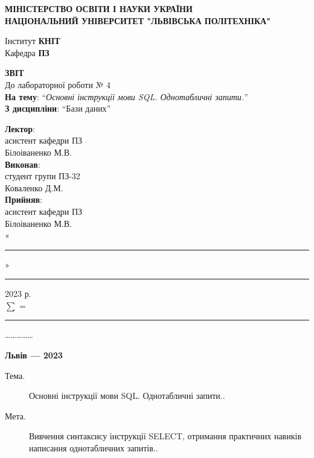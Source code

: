 \documentclass[14pt]{extreport}
\newcommand\subject{Бази даних}
\newcommand\lecturer{асистент кафедри ПЗ\\Білоіваненко М.В.}
\newcommand\teacher{асистент кафедри ПЗ\\Білоіваненко М.В.}
\newcommand\mygroup{ПЗ-32}
\newcommand\lab{4}
\newcommand\theme{Основні інструкції мови SQL. Однотабличні запити.}
\newcommand\purpose{Вивчення синтаксису інструкції SELECT, отримання практичних навиків
	написання однотабличних запитів.}
\begin{document}
\begin{normalsize}
	\begin{titlepage}
		\thispagestyle{empty}
		\begin{center}
			\textbf{МІНІСТЕРСТВО ОСВІТИ І НАУКИ УКРАЇНИ\\
				НАЦІОНАЛЬНИЙ УНІВЕРСИТЕТ "ЛЬВІВСЬКА ПОЛІТЕХНІКА"}
		\end{center}
		\begin{flushright}
			Інститут \textbf{КНІТ}\\
			Кафедра \textbf{ПЗ}
		\end{flushright}
		\vspace{200pt}
		\begin{center}
			\textbf{ЗВІТ}\\
			\vspace{10pt}
			До лабораторної роботи № \lab\\
			\textbf{На тему}: “\textit{\theme}”\\
			\textbf{З дисципліни}: “\subject”
		\end{center}
		\vspace{40pt}
		\begin{flushright}
			
			\textbf{Лектор}:\\
			\lecturer\\
			\vspace{10pt}
			\textbf{Виконав}:\\
			
			студент групи \mygroup\\
			Коваленко Д.М.\\
			\vspace{10pt}
			\textbf{Прийняв}:\\
			
			\teacher\\
			
			\vspace{28pt}
			«\rule{1cm}{0.15mm}» \rule{1.5cm}{0.15mm} 2023 р.\\
			$\sum$ = \rule{1cm}{0.15mm}……………\\
			
		\end{flushright}
		\vspace{\fill}
		\begin{center}
			\textbf{Львів — 2023}
		\end{center}
	\end{titlepage}
		
	\begin{description}
		\item[Тема.] \theme.
		\item[Мета.] \purpose.
	\end{description}


\end{normalsize}
\end{document}
